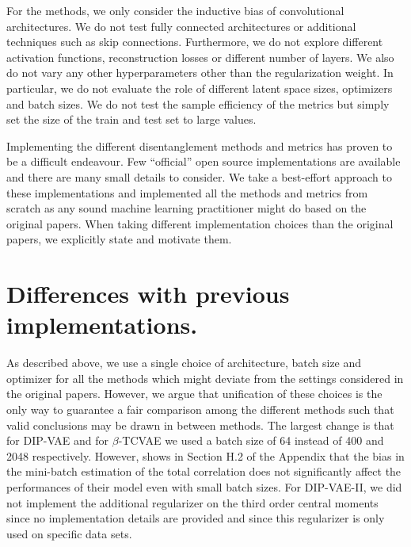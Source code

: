 For the methods, we only consider the inductive bias of convolutional architectures. 
We do not test fully connected architectures or additional techniques such as skip connections. 
Furthermore, we do not explore different activation functions, reconstruction losses or different number of layers. 
We also do not vary any other hyperparameters other than the regularization weight. 
In particular, we do not evaluate the role of different latent space sizes, optimizers and batch sizes. 
We do not test the sample efficiency of the metrics but simply set the size of the train and test set to large values.

Implementing the different disentanglement methods and metrics has proven to be a difficult endeavour.
Few ``official'' open source implementations are available and there are many small details to consider.
We take a best-effort approach to these implementations and implemented all the methods and metrics from scratch as any sound machine learning practitioner might do based on the original papers.
When taking different implementation choices than the original papers, we explicitly state and motivate them.
\section{Differences with previous implementations.}\label{app:differences}
As described above, we use a single choice of architecture, batch size and optimizer for all the methods which might deviate from the settings considered in the original papers.
However, we argue that unification of these choices is the only way to guarantee a fair comparison among the different methods such that valid conclusions may be drawn in between methods.
The largest change is that for DIP-VAE and for $\beta$-TCVAE we used a batch size of 64 instead of 400 and 2048 respectively.
However, \citet{chen2018isolating} shows in Section H.2 of the Appendix that the bias in the mini-batch estimation of the total correlation does not  significantly affect the performances of their model even with small batch sizes.
For DIP-VAE-II, we did not implement the additional regularizer on the third order central moments since no implementation details are provided and since this regularizer is only used on specific data sets.

